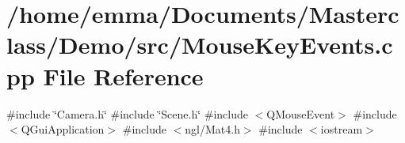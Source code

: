 \section{/home/emma/\+Documents/\+Masterclass/\+Demo/src/\+Mouse\+Key\+Events.cpp File Reference}
\label{_mouse_key_events_8cpp}
{\ttfamily \#include \char`\"{}Camera.\+h\char`\"{}}\newline
{\ttfamily \#include \char`\"{}Scene.\+h\char`\"{}}\newline
{\ttfamily \#include $<$Q\+Mouse\+Event$>$}\newline
{\ttfamily \#include $<$Q\+Gui\+Application$>$}\newline
{\ttfamily \#include $<$ngl/\+Mat4.\+h$>$}\newline
{\ttfamily \#include $<$iostream$>$}\newline
